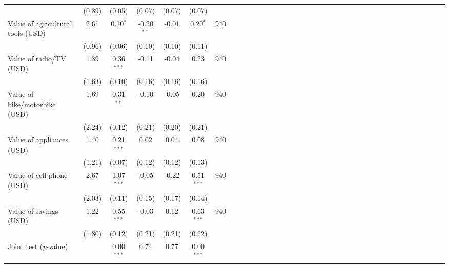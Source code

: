 {\begin{tabular}{l*{6}{SSSSSc}}
          &   (0.89)&   (0.05)&   (0.07)&   (0.07)&   (0.07)&         \\
\hspace{0.2cm}Value of agricultural tools (USD)&     2.61&0.10$^{*}$&-0.20$^{**}$&    -0.01&0.20$^{*}$&      940\\
          &   (0.96)&   (0.06)&   (0.10)&   (0.10)&   (0.11)&         \\
\hspace{0.2cm}Value of radio/TV (USD)&     1.89&0.36$^{***}$&    -0.11&    -0.04&     0.23&      940\\
          &   (1.63)&   (0.10)&   (0.16)&   (0.16)&   (0.16)&         \\
\hspace{0.2cm}Value of bike/motorbike (USD)&     1.69&0.31$^{**}$&    -0.10&    -0.05&     0.20&      940\\
          &   (2.24)&   (0.12)&   (0.21)&   (0.20)&   (0.21)&         \\
\hspace{0.2cm}Value of appliances (USD)&     1.40&0.21$^{***}$&     0.02&     0.04&     0.08&      940\\
          &   (1.21)&   (0.07)&   (0.12)&   (0.12)&   (0.13)&         \\
\hspace{0.2cm}Value of cell phone (USD)&     2.67&1.07$^{***}$&    -0.05&    -0.22&0.51$^{***}$&      940\\
          &   (2.03)&   (0.11)&   (0.15)&   (0.17)&   (0.14)&         \\
Value of savings (USD)&     1.22&0.55$^{***}$&    -0.03&     0.12&0.63$^{***}$&      940\\
          &   (1.80)&   (0.12)&   (0.21)&   (0.21)&   (0.22)&         \\
\midrule Joint test (\emph{p}-value)&         &0.00$^{***}$&     0.74&     0.77&0.00$^{***}$&         \\
\bottomrule
\end{tabular}
}

